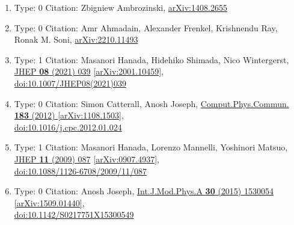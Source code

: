\documentclass[a4paper,10pt]{article}
\begin{document}
\begin{enumerate}
\begin{enumerate}
  \item Type: 0 Citation: Zbigniew Ambrozinski, \href{https://arxiv.org/abs/1408.2655}{arXiv:1408.2655}
  \item Type: 0 Citation: Amr Ahmadain, Alexander Frenkel, Krishnendu Ray, Ronak M. Soni, \href{https://arxiv.org/abs/2210.11493}{arXiv:2210.11493}
  \item Type: 1 Citation: Masanori Hanada, Hidehiko Shimada, Nico Wintergerst, \href{https://www.doi.org/10.1007/JHEP08(2021)039}{JHEP {\bf 08} (2021) 039}  \href{https://arxiv.org/abs/2001.10459}{[arXiv:2001.10459]},\\\href{https://www.doi.org/10.1007/JHEP08(2021)039}{doi:10.1007/JHEP08(2021)039}
  \item Type: 0 Citation: Simon Catterall, Anosh Joseph, \href{https://www.doi.org/10.1016/j.cpc.2012.01.024}{Comput.Phys.Commun. {\bf 183} (2012) }  \href{https://arxiv.org/abs/1108.1503}{[arXiv:1108.1503]},\\\href{https://www.doi.org/10.1016/j.cpc.2012.01.024}{doi:10.1016/j.cpc.2012.01.024}
  \item Type: 1 Citation: Masanori Hanada, Lorenzo Mannelli, Yoshinori Matsuo, \href{https://www.doi.org/10.1088/1126-6708/2009/11/087}{JHEP {\bf 11} (2009) 087}  \href{https://arxiv.org/abs/0907.4937}{[arXiv:0907.4937]},\\\href{https://www.doi.org/10.1088/1126-6708/2009/11/087}{doi:10.1088/1126-6708/2009/11/087}
  \item Type: 0 Citation: Anosh Joseph, \href{https://www.doi.org/10.1142/S0217751X15300549}{Int.J.Mod.Phys.A {\bf 30} (2015) 1530054}  \href{https://arxiv.org/abs/1509.01440}{[arXiv:1509.01440]},\\\href{https://www.doi.org/10.1142/S0217751X15300549}{doi:10.1142/S0217751X15300549}

\end{enumerate}
\end{enumerate}
\end{document}
